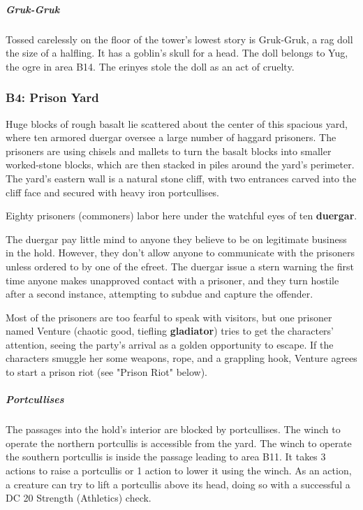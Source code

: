 \documentclass[10pt,a4paper,twoside,bg=print,twocolumn,openany,nodeprecatedcode]{dndbook}
\begin{document}
\subparagraph{Gruk-Gruk}
Tossed carelessly on the floor of the tower's lowest story is Gruk-Gruk, a rag doll the size of a halfling. It has a goblin's skull for a head. The doll belongs to Yug, the ogre in area B14. The erinyes stole the doll as an act of cruelty.

\subsubsection{B4: Prison Yard}
\begin{DndReadAloud}{}
Huge blocks of rough basalt lie scattered about the center of this spacious yard, where ten armored duergar oversee a large number of haggard prisoners. The prisoners are using chisels and mallets to turn the basalt blocks into smaller worked-stone blocks, which are then stacked in piles around the yard's perimeter. The yard's eastern wall is a natural stone cliff, with two entrances carved into the cliff face and secured with heavy iron portcullises.

\end{DndReadAloud}

Eighty prisoners (commoners) labor here under the watchful eyes of ten \textbf{duergar}.

The duergar pay little mind to anyone they believe to be on legitimate business in the hold. However, they don't allow anyone to communicate with the prisoners unless ordered to by one of the efreet. The duergar issue a stern warning the first time anyone makes unapproved contact with a prisoner, and they turn hostile after a second instance, attempting to subdue and capture the offender.

Most of the prisoners are too fearful to speak with visitors, but one prisoner named Venture (chaotic good, tiefling \textbf{gladiator}) tries to get the characters' attention, seeing the party's arrival as a golden opportunity to escape. If the characters smuggle her some weapons, rope, and a grappling hook, Venture agrees to start a prison riot (see "Prison Riot" below).

\subparagraph{Portcullises}
The passages into the hold's interior are blocked by portcullises. The winch to operate the northern portcullis is accessible from the yard. The winch to operate the southern portcullis is inside the passage leading to area B11. It takes 3 actions to raise a portcullis or 1 action to lower it using the winch. As an action, a creature can try to lift a portcullis above its head, doing so with a successful a DC 20 Strength (Athletics) check.
\end{document}
